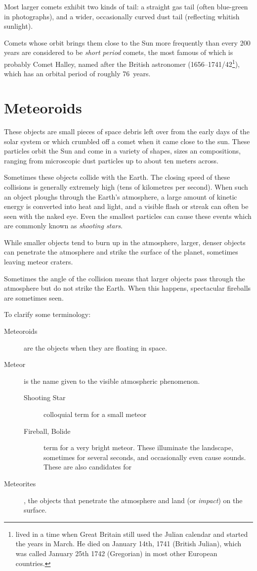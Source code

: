 Most larger comets exhibit two kinds of tail: a straight gas tail
(often blue-green in photographs), and a wider, occasionally curved
dust tail (reflecting whitish sunlight).

Comets whose orbit brings them close to the Sun more frequently than
every 200 years are considered to be \emph{short period} comets, the
most famous of which is probably Comet Halley, named after the British
astronomer  (1656--1741/42\footnote{ lived 
in a time when Great Britain still used the Julian calendar and started 
the years in March. He died on January 14th, 1741 (British Julian), 
which was called January 25th 1742 (Gregorian) in most other European countries.}), 
which has an orbital period of roughly 76~years.


\section{Meteoroids}
\label{sec:Phenomena:Meteoroids}

These objects are small pieces of space debris left over from the early
days of the solar system or which crumbled off a comet when it came close to the sun. 
These particles orbit the Sun and come in a variety of shapes, 
sizes an compositions, ranging from microscopic dust particles
up to about ten meters across.

Sometimes these objects collide with the Earth. The closing speed of
these collisions is generally extremely high (tens of kilometres per
second). When such an object ploughs through the Earth's atmosphere, a
large amount of kinetic energy is converted into heat and light, and a
visible flash or streak can often be seen with the naked eye. Even the
smallest particles can cause these events which are commonly known as
\emph{shooting stars}.

While smaller objects tend to burn up in the atmosphere, larger, denser
objects can penetrate the atmosphere and strike the surface of the
planet, sometimes leaving meteor craters.

Sometimes the angle of the collision means that larger objects pass
through the atmosphere but do not strike the Earth. When this happens,
spectacular fireballs are sometimes seen.

To clarify some terminology:
\begin{description}
\item[Meteoroids]  are the objects when they are floating in space.
\item[Meteor] is the name given to the visible atmospheric phenomenon.
\begin{description}
 \item[Shooting Star] colloquial term for a small meteor
 \item[Fireball, Bolide] term for a very bright meteor. These illuminate the landscape, 
  sometimes for several seconds, and occasionally even cause sounds. These are also candidates for 
\end{description}
\item[Meteorites], the objects that penetrate the
atmosphere and land (or \emph{impact}) on the surface.
\end{description}


